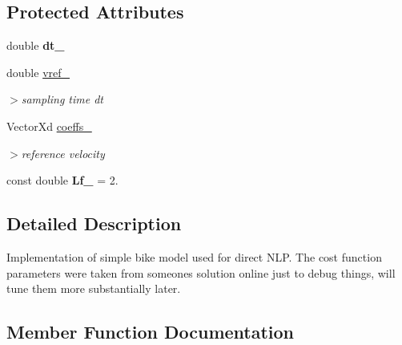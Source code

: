 \subsection*{Protected Attributes}
\begin{DoxyCompactItemize}
\item 
\mbox{\label{classBikeModel_a63db3108808278d117c90c46f1e5a8ef}} 
double {\bfseries dt\+\_\+}
\item 
\mbox{\label{classBikeModel_a834c3c01ffd9c860456d22932529d24f}} 
double \mbox{\hyperlink{classBikeModel_a834c3c01ffd9c860456d22932529d24f}{vref\+\_\+}}
\begin{DoxyCompactList}\small\item\em $>$sampling time dt \end{DoxyCompactList}\item 
\mbox{\label{classBikeModel_aad97836300d513f5743498d62f47e08a}} 
Vector\+Xd \mbox{\hyperlink{classBikeModel_aad97836300d513f5743498d62f47e08a}{coeffs\+\_\+}}
\begin{DoxyCompactList}\small\item\em $>$reference velocity \end{DoxyCompactList}\item 
\mbox{\label{classBikeModel_a50a07eee90bb82d227f63dcdf07f036c}} 
const double {\bfseries Lf\+\_\+} = 2.
\end{DoxyCompactItemize}


\subsection{Detailed Description}
Implementation of simple bike model used for direct N\+LP. The cost function parameters were taken from someone\textquotesingle{}s solution online just to debug things, will tune them more substantially later. 

\subsection{Member Function Documentation}
\mbox{\label{classBikeModel_a697e6ec00a4a38ca844c491041cc9b86}} 
